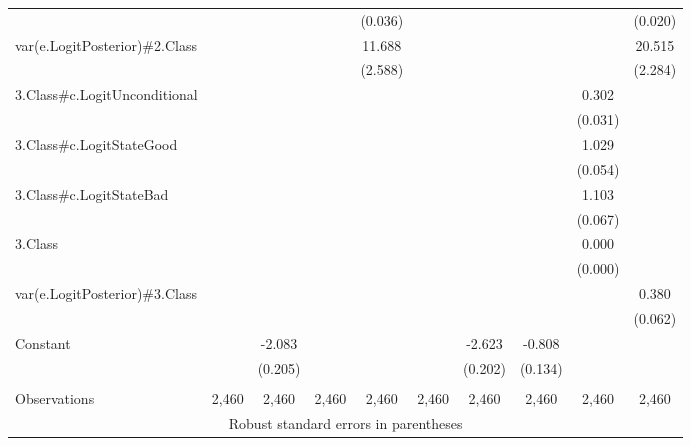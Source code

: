 \documentclass[]{article}
\begin{document}
\begin{tabular}{lccccccccc}
 &  &  &  & (0.036) &  &  &  &  & (0.020) \\
var(e.LogitPosterior)\#2.Class &  &  &  & 11.688 &  &  &  &  & 20.515 \\
 &  &  &  & (2.588) &  &  &  &  & (2.284) \\
3.Class\#c.LogitUnconditional &  &  &  &  &  &  &  & 0.302 &  \\
 &  &  &  &  &  &  &  & (0.031) &  \\
3.Class\#c.LogitStateGood &  &  &  &  &  &  &  & 1.029 &  \\
 &  &  &  &  &  &  &  & (0.054) &  \\
3.Class\#c.LogitStateBad &  &  &  &  &  &  &  & 1.103 &  \\
 &  &  &  &  &  &  &  & (0.067) &  \\
3.Class &  &  &  &  &  &  &  & 0.000 &  \\
 &  &  &  &  &  &  &  & (0.000) &  \\
var(e.LogitPosterior)\#3.Class &  &  &  &  &  &  &  &  & 0.380 \\
 &  &  &  &  &  &  &  &  & (0.062) \\
Constant &  & -2.083 &  &  &  & -2.623 & -0.808 &  &  \\
 &  & (0.205) &  &  &  & (0.202) & (0.134) &  &  \\
 &  &  &  &  &  &  &  &  &  \\
 Observations & 2,460 & 2,460 & 2,460 & 2,460 & 2,460 & 2,460 & 2,460 & 2,460 & 2,460 \\ \hline
\multicolumn{10}{c}{ Robust standard errors in parentheses} \\
\end{tabular}
\end{document}
